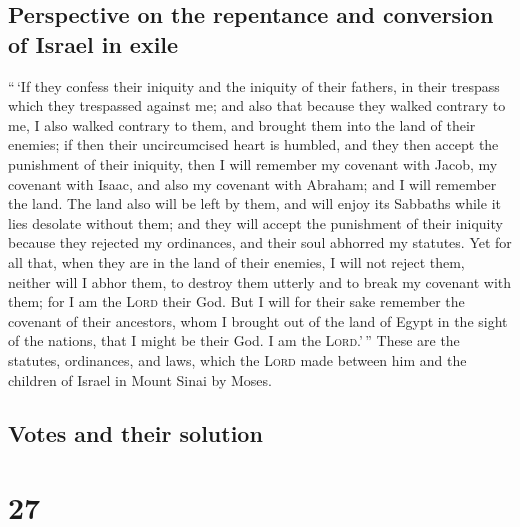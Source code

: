 \hypertarget{perspective-on-the-repentance-and-conversion-of-israel-in-exile}{%
\subsection{Perspective on the repentance and conversion of Israel in
exile}\label{perspective-on-the-repentance-and-conversion-of-israel-in-exile}}

 ``\,`If they confess their iniquity and the iniquity of
their fathers, in their trespass which they trespassed against me; and
also that because they walked contrary to me,  I also
walked contrary to them, and brought them into the land of their
enemies; if then their uncircumcised heart is humbled, and they then
accept the punishment of their iniquity,  then I will
remember my covenant with Jacob, my covenant with Isaac, and also my
covenant with Abraham; and I will remember the land.  The
land also will be left by them, and will enjoy its Sabbaths while it
lies desolate without them; and they will accept the punishment of their
iniquity because they rejected my ordinances, and their soul abhorred my
statutes.  Yet for all that, when they are in the land of
their enemies, I will not reject them, neither will I abhor them, to
destroy them utterly and to break my covenant with them; for I am the
\textsc{Lord} their God.  But I will for their sake
remember the covenant of their ancestors, whom I brought out of the land
of Egypt in the sight of the nations, that I might be their God. I am
the \textsc{Lord}.'\,''  These are the statutes,
ordinances, and laws, which the \textsc{Lord} made between him and the
children of Israel in Mount Sinai by Moses.

\hypertarget{votes-and-their-solution}{%
\subsection{Votes and their solution}\label{votes-and-their-solution}}

\hypertarget{section-26}{%
\section{27}\label{section-26}}

